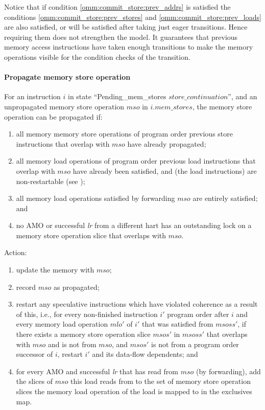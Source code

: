 \begin{commentary}
Notice that if condition \ref{omm:commit_store:prev_addrs} is satisfied the conditions \ref{omm:commit_store:prev_stores} and \ref{omm:commit_store:prev_loads} are also satisfied, or will be satisfied after taking just eager transitions.
Hence requiring them does not strengthen the model.
It guarantees that previous memory access instructions have taken enough transitions to make the memory operations visible for the condition checks of the  transition.
\end{commentary}


\paragraph{Propagate memory store operation}\label{omm:hart:prop_store}
For an instruction $i$ in state ``{\sc Pending\_mem\_stores} $store\_continuation$'', and an unpropagated memory store operation $mso$ in $i.mem\_stores$, the memory store operation can be propagated if:
\begin{enumerate}
\item all memory memory store operations of program order previous store instructions that overlap with $mso$ have already propagated;
\item all memory load operations of program order previous load instructions that overlap with $mso$ have already been satisfied, and (the load instructions) are non-restartable (see );
\item all memory load operations satisfied by forwarding $mso$ are entirely satisfied; and
\item no AMO or successful {\em lr} from a different hart has an outstanding lock on a memory store operation slice that overlaps with $mso$.
\end{enumerate}
Action:
\begin{enumerate}
\item update the memory with $mso$;
\item record $mso$ as propagated;
\item restart any speculative instructions which have violated coherence as a result of this, i.e., for every non-finished instruction $i'$ program order after $i$ and every memory load operation $mlo'$ of $i'$ that was satisfied from $msoss'$, if there exists a memory store operation slice $msos'$ in $msoss'$ that overlaps with $mso$ and is not from $mso$, and $msos'$ is not from a program order successor of $i$, restart $i'$ and its data-flow dependents; and
\item for every AMO and successful {\em lr} that has read from $mso$ (by forwarding), add the slices of $mso$ this load reads from to the set of memory store operation slices the memory load operation of the load is mapped to in the exclusives map.
\end{enumerate}

